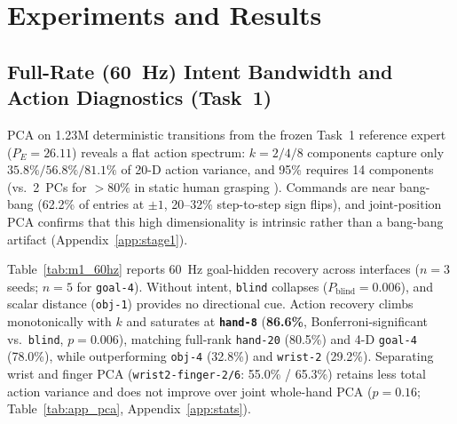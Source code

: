 \section{Experiments and Results}
\label{sec:experiments}

\subsection{Full-Rate (60~Hz) Intent Bandwidth and Action Diagnostics (Task~1)}
\label{sec:exp_m1}
PCA on 1.23M deterministic transitions from the frozen Task~1 reference expert ($P_E = 26.11$) reveals a flat action spectrum: $k=2/4/8$ components capture only $35.8\% / 56.8\% / 81.1\%$ of 20-D action variance, and 95\% requires 14 components (vs.\ 2~PCs for $>80\%$ in static human grasping \citep{santello1998postural}).
Commands are near bang-bang (62.2\% of entries at $\pm 1$, 20--32\% step-to-step sign flips), and joint-position PCA confirms that this high dimensionality is intrinsic rather than a bang-bang artifact (Appendix~\ref{app:stage1}).

Table~\ref{tab:m1_60hz} reports 60~Hz goal-hidden recovery across interfaces ($n=3$ seeds; $n=5$ for \texttt{goal-4}).
Without intent, \texttt{blind} collapses ($P_{\mathrm{blind}} = 0.006$), and scalar distance (\texttt{obj-1}) provides no directional cue.
Action recovery climbs monotonically with $k$ and saturates at \textbf{\texttt{hand-8}} (\textbf{86.6\%}, Bonferroni-significant vs.\ \texttt{blind}, $p=0.006$), matching full-rank \texttt{hand-20} (80.5\%) and 4-D \texttt{goal-4} (78.0\%), while outperforming \texttt{obj-4} (32.8\%) and \texttt{wrist-2} (29.2\%).
Separating wrist and finger PCA (\texttt{wrist2-finger-2/6}: 55.0\% / 65.3\%) retains less total action variance and does not improve over joint whole-hand PCA ($p=0.16$; Table~\ref{tab:app_pca}, Appendix~\ref{app:stats}).

